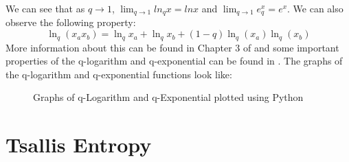 \documentclass[11pt]{article}
\numberwithin{equation}{section}
\begin{document}
We can see that as $q\to 1$, $ \lim_{q\to 1} ln_q x=ln x $ and $ \lim_{q\to 1} e_{q}^x=e^x $. We can also observe the following property:
\begin{equation}
	\ln_q (x_a x_b)=\ln_q x_a +\ln_q x_b + (1-q)\ln_q (x_a)\ln_q (x_b)
\end{equation}
More information about this can be found in Chapter 3 of \cite{tsallis2009introduction} and some important properties of the q-logarithm and q-exponential can be found in \cite{YAMANO2002486}. The graphs of the q-logarithm and q-exponential functions look like:

\begin{figure}[H]
	\centering
	\caption{Graphs of q-Logarithm and q-Exponential plotted using Python}
	\label{q_log}
\end{figure}

\section{Tsallis Entropy}
\end{document}
